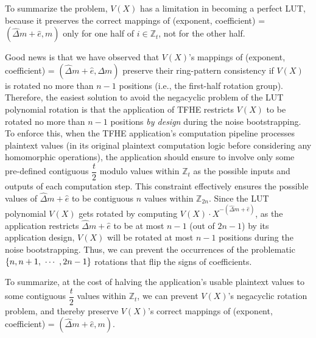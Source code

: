 To summarize the problem, $V(X)$ has a limitation in becoming a perfect LUT, because it preserves the correct mappings of (exponent, coefficient) = $(\hat{\Delta} m + \hat{e}, m)$ only for one half of $i \in \mathbb{Z}_t$, not for the other half. 

Good news is that we have observed that $V(X)$'s mappings of (exponent, coefficient) = $(\hat{\Delta} m + \hat e, \Delta m)$ preserve their ring-pattern consistency if $V(X)$ is rotated no more than $n-1$ positions (i.e., the first-half rotation group). Therefore, the easiest solution to avoid the negacyclic problem of the LUT polynomial rotation is that the application of TFHE restricts $V(X)$ to be rotated no more than $n-1$ positions \textit{by design} during the noise bootstrapping. To enforce this, when the TFHE application's computation pipeline processes plaintext values (in its original plaintext computation logic before considering any homomorphic operations), the application should ensure to involve only some pre-defined contiguous $\dfrac{t}{2}$ modulo values within $\mathbb{Z}_t$ as the possible inputs and outputs of each computation step. This constraint effectively ensures the possible values of $\hat\Delta m + \hat e$ to be contiguous $n$ values within $\mathbb{Z}_{2n}$. Since the LUT polynomial $V(X)$ gets rotated by computing $V(X)\cdot X^{-(\hat\Delta m + \hat e)}$, as the application restricts $\hat\Delta m + \hat e$ to be at most $n-1$ (out of $2n - 1$) by its application design, $V(X)$ will be rotated at most $n-1$ positions during the noise bootstrapping. Thus, we can prevent the occurrences of the problematic $\{n, n+1, \text{ } \text{$\cdots$} \text{ }, 2n -1 \}$ rotations that flip the signs of coefficients.  

To summarize, at the cost of halving the application's usable plaintext values to some contiguous $\dfrac{t}{2}$ values within $\mathbb{Z}_t$, we can prevent $V(X)$'s negacyclic rotation problem, and thereby preserve $V(X)$'s correct mappings of (exponent, coefficient) = $(\hat{\Delta} m + \hat e, m)$.

